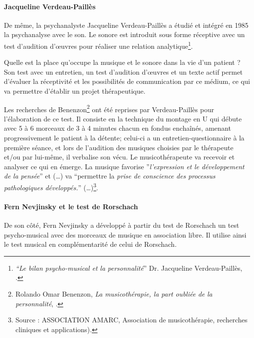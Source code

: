 \paragraph{Jacqueline Verdeau-Paillès}De même, la psychanalyste Jacqueline Verdeau-Paillès a étudié et
intégré en 1985 la psychanalyse avec le son.  Le sonore est  introduit
sous forme réceptive avec un test d'audition d'\oe uvres pour réaliser
une relation analytique\footnote{\emph{``Le bilan psycho-musical et la
    personnalité}'' Dr. Jacqueline Verdeau-Paillès,
  \cite{verdeau-pailles}.}.

Quelle est la place qu'occupe la musique et le sonore dans la vie d'un patient ? Son test avec un entretien, un test d'audition d'\oe uvres et un texte actif permet d'évaluer la réceptivité et les possibilités de communication par ce médium, ce qui va permettre d'établir un projet thérapeutique.

Les recherches de Benenzon\footnote{Rolando Omar
  Benenzon, \emph{La musicothérapie, la part oubliée de la
    personnalité}, \cite{Benenzon2007}.} ont été reprises par
Verdeau-Paillès pour l'élaboration de ce test. Il consiste en la technique du montage en U qui débute avec 5 à 6 morceaux de 3 à 4 minutes chacun en fondus enchaînés, amenant progressivement le patient à la détente; celui-ci a un entretien-questionnaire à la première
séance, et lors de l'audition des musiques choisies par le thérapeute
et/ou par lui-même, il  verbalise son vécu. Le musicothérapeute
va recevoir et analyser ce qui en émerge. 
La musique favorise  ''\emph{l'expression et le développement
	de la pensée}'' et (\ldots) va ``permettre la \emph{prise de conscience
	des processus pathologiques développés.}''
  (\ldots)\footnote{Source : ASSOCIATION AMARC,
  Association de musicothérapie, recherches cliniques et
  applications). }.


 \paragraph{Fern Nevjinsky et le test de Rorschach}
 De son côté, Fern Nevjinsky a développé à partir du  test de Rorschach un test psycho-musical avec des morceaux
de musique en association libre. Il utilise ainsi le test
musical en complémentarité de celui de Rorschach.

 
